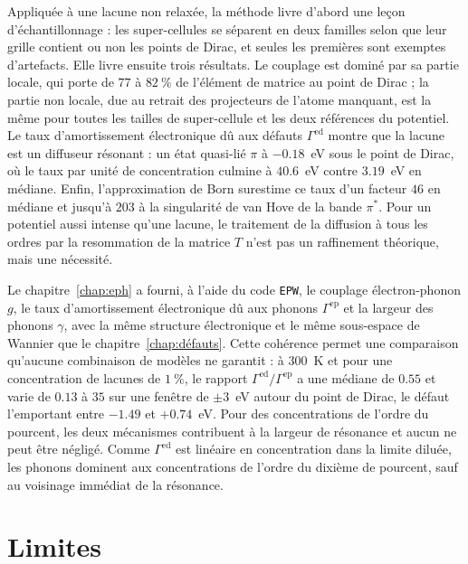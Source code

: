 Appliquée à une lacune non relaxée, la méthode livre d'abord une leçon d'échantillonnage : les super-cellules se séparent en deux familles selon que leur grille contient ou non les points de Dirac, et seules les premières sont exemptes d'artefacts. Elle livre ensuite trois résultats. Le couplage est dominé par sa partie locale, qui porte de $77$ à $82~\%$ de l'élément de matrice au point de Dirac ; la partie non locale, due au retrait des projecteurs de l'atome manquant, est la même pour toutes les tailles de super-cellule et les deux références du potentiel. Le taux d'amortissement électronique dû aux défauts $\Gamma^\text{ed}$ montre que la lacune est un diffuseur résonant : un état quasi-lié $\pi$ à $-0.18$~eV sous le point de Dirac, où le taux par unité de concentration culmine à $40.6$~eV contre $3.19$~eV en médiane. Enfin, l'approximation de Born surestime ce taux d'un facteur $46$ en médiane et jusqu'à $203$ à la singularité de van Hove de la bande $\pi^*$. Pour un potentiel aussi intense qu'une lacune, le traitement de la diffusion à tous les ordres par la resommation de la matrice $T$ n'est pas un raffinement théorique, mais une nécessité.

Le chapitre~\ref{chap:eph} a fourni, à l'aide du code \texttt{EPW}, le couplage électron-phonon $g$, le taux d'amortissement électronique dû aux phonons $\Gamma^\text{ep}$ et la largeur des phonons $\gamma$, avec la même structure électronique et le même sous-espace de Wannier que le chapitre~\ref{chap:défauts}. Cette cohérence permet une comparaison qu'aucune combinaison de modèles ne garantit : à $300$~K et pour une concentration de lacunes de $1~\%$, le rapport $\Gamma^\text{ed}/\Gamma^\text{ep}$ a une médiane de $0.55$ et varie de $0.13$ à $35$ sur une fenêtre de $\pm 3$~eV autour du point de Dirac, le défaut l'emportant entre $-1.49$ et $+0.74$~eV. Pour des concentrations de l'ordre du pourcent, les deux mécanismes contribuent à la largeur de résonance et aucun ne peut être négligé. Comme $\Gamma^\text{ed}$ est linéaire en concentration dans la limite diluée, les phonons dominent aux concentrations de l'ordre du dixième de pourcent, sauf au voisinage immédiat de la résonance.

\section{Limites}

